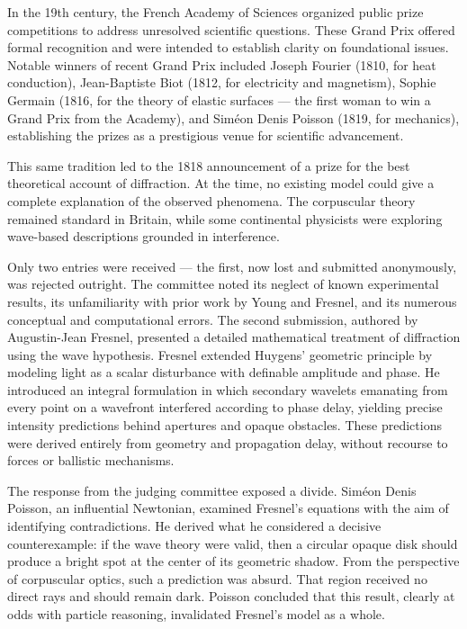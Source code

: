 In the 19th century, the French Academy of Sciences organized public prize competitions to address unresolved scientific questions. These Grand Prix offered formal recognition and were intended to establish clarity on foundational issues. Notable winners of recent Grand Prix included Joseph Fourier (1810, for heat conduction), Jean-Baptiste Biot (1812, for electricity and magnetism), Sophie Germain (1816, for the theory of elastic surfaces — the first woman to win a Grand Prix from the Academy), and Siméon Denis Poisson (1819, for mechanics), establishing the prizes as a prestigious venue for scientific advancement.

This same tradition led to the 1818 announcement of a prize for the best theoretical account of diffraction. At the time, no existing model could give a complete explanation of the observed phenomena. The corpuscular theory remained standard in Britain, while some continental physicists were exploring wave-based descriptions grounded in interference.

Only two entries were received — the first, now lost and submitted anonymously, was rejected outright. The committee noted its neglect of known experimental results, its unfamiliarity with prior work by Young and Fresnel, and its numerous conceptual and computational errors. The second submission, authored by Augustin-Jean Fresnel, presented a detailed mathematical treatment of diffraction using the wave hypothesis. Fresnel extended Huygens' geometric principle by modeling light as a scalar disturbance with definable amplitude and phase. He introduced an integral formulation in which secondary wavelets emanating from every point on a wavefront interfered according to phase delay, yielding precise intensity predictions behind apertures and opaque obstacles. These predictions were derived entirely from geometry and propagation delay, without recourse to forces or ballistic mechanisms.

The response from the judging committee exposed a divide. Siméon Denis Poisson, an influential Newtonian, examined Fresnel's equations with the aim of identifying contradictions. He derived what he considered a decisive counterexample: if the wave theory were valid, then a circular opaque disk should produce a bright spot at the center of its geometric shadow. From the perspective of corpuscular optics, such a prediction was absurd. That region received no direct rays and should remain dark. Poisson concluded that this result, clearly at odds with particle reasoning, invalidated Fresnel's model as a whole.

